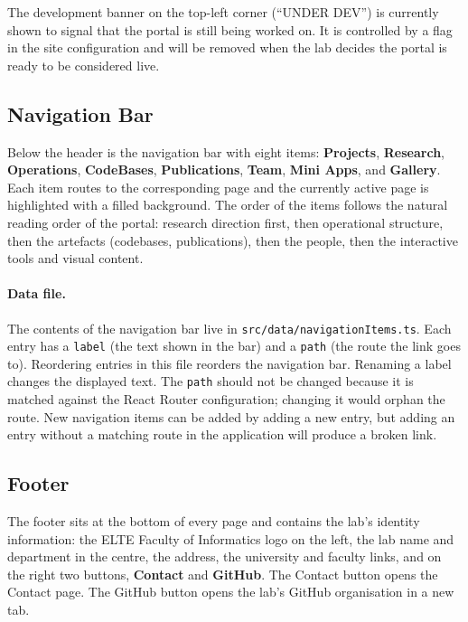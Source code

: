 The development banner on the top-left corner (``UNDER DEV'') is currently shown to signal that the portal is still being worked on. It is controlled by a flag in the site configuration and will be removed when the lab decides the portal is ready to be considered live.

\subsection{Navigation Bar}\label{subsec:user-nav}

Below the header is the navigation bar with eight items: \textbf{Projects}, \textbf{Research}, \textbf{Operations}, \textbf{CodeBases}, \textbf{Publications}, \textbf{Team}, \textbf{Mini Apps}, and \textbf{Gallery}. Each item routes to the corresponding page and the currently active page is highlighted with a filled background. The order of the items follows the natural reading order of the portal: research direction first, then operational structure, then the artefacts (codebases, publications), then the people, then the interactive tools and visual content.

\paragraph{Data file.} The contents of the navigation bar live in \texttt{src/data/navigationItems.ts}. Each entry has a \texttt{label} (the text shown in the bar) and a \texttt{path} (the route the link goes to). Reordering entries in this file reorders the navigation bar. Renaming a label changes the displayed text. The \texttt{path} should not be changed because it is matched against the React Router configuration; changing it would orphan the route. New navigation items can be added by adding a new entry, but adding an entry without a matching route in the application will produce a broken link.

\subsection{Footer}\label{subsec:user-footer}

The footer sits at the bottom of every page and contains the lab's identity information: the ELTE Faculty of Informatics logo on the left, the lab name and department in the centre, the address, the university and faculty links, and on the right two buttons, \textbf{Contact} and \textbf{GitHub}. The Contact button opens the Contact page. The GitHub button opens the lab's GitHub organisation in a new tab.

